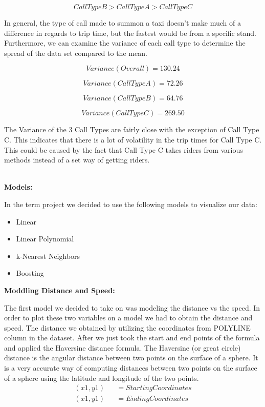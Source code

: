 \documentclass[11pt]{article}
\begin{document}
\begin{equation}
Call Type B >Call Type A > Call Type C
\end{equation}

\par
In general, the type of call made to summon a taxi doesn’t make much of a difference in regards to trip time, but the fastest would be from a specific stand. Furthermore, we can examine the variance of each call type to determine the spread of the data set compared to the mean.

\begin{equation}
Variance (Overall) = 130.24
\end{equation}

\begin{equation}
Variance (Call Type A) = 72.26
\end{equation}

\begin{equation}
Variance (Call Type B) = 64.76
\end{equation}

\begin{equation}
Variance (Call Type C) = 269.50
\end{equation}

\par
The Variance of the 3 Call Types are fairly close with the exception of Call Type C. This indicates that there is a lot of volatility in the trip times for Call Type C. This could be caused by the fact that Call Type C takes riders from various methods instead of a set way of getting riders.

\\
\textbf{Models:}
\par
In the term project we decided to use the following models to visualize our data:
\begin{itemize}
	\item Linear
	\item Linear Polynomial
	\item k-Nearest Neighbors
	\item Boosting
\end{itemize}

\textbf{Moddling Distance and Speed:}
\par
The first model we decided to take on was modeling the distance vs the 
speed. In order to plot these two variables on a model we had to obtain 
the distance and speed. The distance we obtained by utilizing the 
coordinates from POLYLINE column in the dataset. After we just took the 
start and end points of the formula and applied the Haversine distance 
formula. The Haversine (or great circle) distance is the angular distance 
between two points on the surface of a sphere. It is a very accurate way 
of computing distances between two points on the surface of a sphere using 
the latitude and longitude of the two points.
\begin{equation*}
	\begin{aligned}
		(x1,y1) &&= Starting Coordinates\\
		(x1,y1) &&=Ending Coordinates
	\end{aligned}
\end{equation*}
\end{document}
